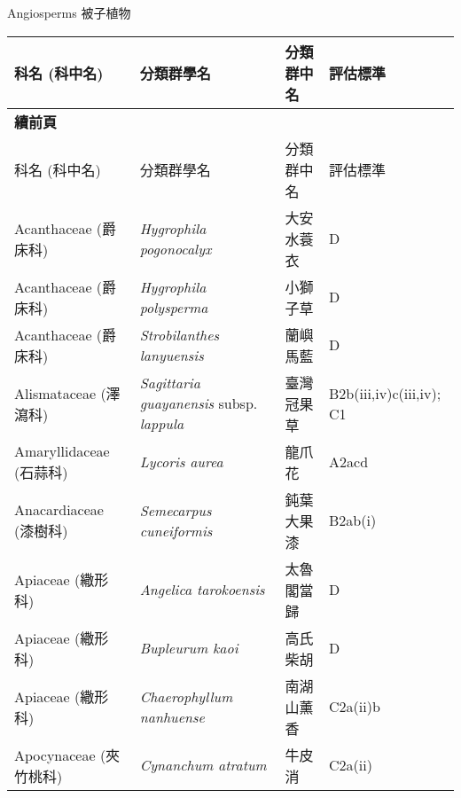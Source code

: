 \noindent\normalfont\selectfont Angiosperms 被子植物
\footnotesize\selectfont
        \begin{longtable}{p{3cm}p{5cm}p{3cm}p{4cm}}
        \toprule
          科名 (科中名) & 分類群學名 & 分類群中名 & 評估標準 \\
        \midrule 
        \endfirsthead

        {{\bfseries 續前頁 }} \\
        科名 (科中名) & 分類群學名 & 分類群中名 & 評估標準 \\
        \midrule
        \endhead
                Acanthaceae (爵床科) & \textit{Hygrophila pogonocalyx}  & 大安水蓑衣 & D \index{Hygrophila@\textit{Hygrophila}!pogonocalyx@\textit{pogonocalyx}}  \index{大安水蓑衣} \\
    Acanthaceae (爵床科) & \textit{Hygrophila polysperma}  & 小獅子草 & D \index{Hygrophila@\textit{Hygrophila}!polysperma@\textit{polysperma}}  \index{小獅子草} \\
    Acanthaceae (爵床科) & \textit{Strobilanthes lanyuensis}  & 蘭嶼馬藍 & D \index{Strobilanthes@\textit{Strobilanthes}!lanyuensis@\textit{lanyuensis}}  \index{蘭嶼馬藍} \\
    Alismataceae (澤瀉科) & \textit{Sagittaria guayanensis} subsp. \textit{lappula}  & 臺灣冠果草 & B2b(iii,iv)c(iii,iv); C1 \index{Sagittaria@\textit{Sagittaria}!guayanensis@\textit{guayanensis}!subsp. lappula@subsp. \textit{lappula}}  \index{臺灣冠果草} \\
    Amaryllidaceae (石蒜科) & \textit{Lycoris aurea}  & 龍爪花 & A2acd \index{Lycoris@\textit{Lycoris}!aurea@\textit{aurea}}  \index{龍爪花} \\
    Anacardiaceae (漆樹科) & \textit{Semecarpus cuneiformis}  & 鈍葉大果漆 & B2ab(i) \index{Semecarpus@\textit{Semecarpus}!cuneiformis@\textit{cuneiformis}}  \index{鈍葉大果漆} \\
    Apiaceae (繖形科) & \textit{Angelica tarokoensis}  & 太魯閣當歸 & D \index{Angelica@\textit{Angelica}!tarokoensis@\textit{tarokoensis}}  \index{太魯閣當歸} \\
    Apiaceae (繖形科) & \textit{Bupleurum kaoi}  & 高氏柴胡 & D \index{Bupleurum@\textit{Bupleurum}!kaoi@\textit{kaoi}}  \index{高氏柴胡} \\
    Apiaceae (繖形科) & \textit{Chaerophyllum nanhuense}  & 南湖山薰香 & C2a(ii)b \index{Chaerophyllum@\textit{Chaerophyllum}!nanhuense@\textit{nanhuense}}  \index{南湖山薰香} \\
    Apocynaceae (夾竹桃科) & \textit{Cynanchum atratum}  & 牛皮消 & C2a(ii) \index{Cynanchum@\textit{Cynanchum}!atratum@\textit{atratum}}  \index{牛皮消} \\

\end{longtable}
